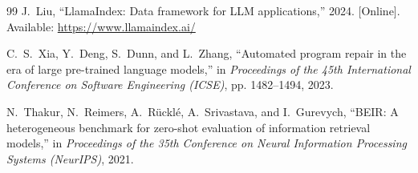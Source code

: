 \documentclass[12pt,a4paper,oneside]{report}
\begin{document}
\begin{thebibliography}{99}
J.~Liu, ``LlamaIndex: Data framework for LLM applications,'' 2024. [Online]. Available: \url{https://www.llamaindex.ai/}

C.~S.~Xia, Y.~Deng, S.~Dunn, and L.~Zhang, ``Automated program repair in the era of large pre-trained language models,'' in \textit{Proceedings of the 45th International Conference on Software Engineering (ICSE)}, pp. 1482--1494, 2023.

N.~Thakur, N.~Reimers, A.~R{\"u}ckl{\'e}, A.~Srivastava, and I.~Gurevych, ``BEIR: A heterogeneous benchmark for zero-shot evaluation of information retrieval models,'' in \textit{Proceedings of the 35th Conference on Neural Information Processing Systems (NeurIPS)}, 2021.

\end{thebibliography}
\end{document}

